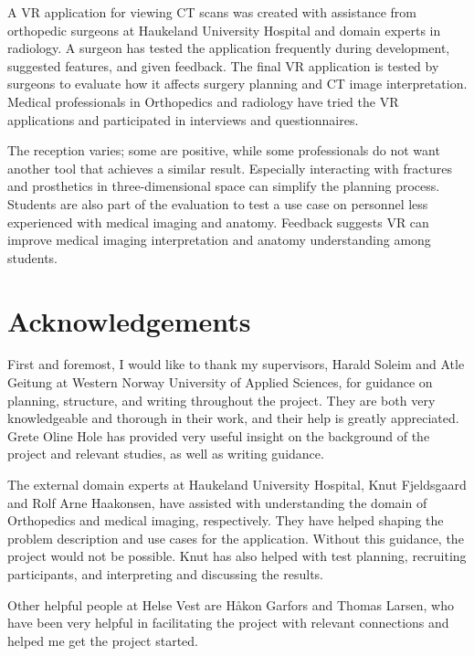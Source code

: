 \documentclass[a4paper]{report}
\begin{document}
A VR application for viewing CT scans was created with assistance from orthopedic surgeons at Haukeland University Hospital and domain experts in radiology. A surgeon has tested the application frequently during development, suggested features, and given feedback.
The final VR application is tested by surgeons to evaluate how it affects surgery planning and CT image interpretation.
Medical professionals in Orthopedics and radiology have tried the VR applications and participated in interviews and questionnaires.

The reception varies; some are positive, while some professionals do not want another tool that achieves a similar result. Especially interacting with fractures and prosthetics in three-dimensional space can simplify the planning process.
Students are also part of the evaluation to test a use case on personnel less experienced with medical imaging and anatomy. Feedback suggests VR can improve medical imaging interpretation and anatomy understanding among students.

\pagebreak
\section*{Acknowledgements}
First and foremost, I would like to thank my supervisors, Harald Soleim and Atle Geitung at Western Norway University of Applied Sciences, for guidance on planning, structure, and writing throughout the project. They are both very knowledgeable and thorough in their work, and their help is greatly appreciated. Grete Oline Hole has provided very useful insight on the background of the project and relevant studies, as well as writing guidance.

The external domain experts at Haukeland University Hospital, Knut Fjeldsgaard and Rolf Arne Haakonsen, have assisted with understanding the domain of Orthopedics and medical imaging, respectively. They have helped shaping the problem description and use cases for the application. Without this guidance, the project would not be possible. Knut has also helped with test planning, recruiting participants, and interpreting and discussing the results.

Other helpful people at Helse Vest are Håkon Garfors and Thomas Larsen, who have been very helpful in facilitating the project with relevant connections and helped me get the project started.

\pagebreak
\tableofcontents
\listoffigures

\end{document}
